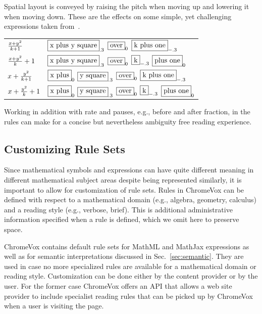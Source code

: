 \documentclass{sig-alternate}
\begin{document}
\noindent 
Spatial layout is conveyed by raising the pitch when moving up and lowering it
when moving down. These are the effects on some simple, yet challenging
expressions taken from~\cite{knuthart}.
\begin{tabular}{lp{}}
  $x+y^2\over k+1$ &
  $\framebox{\text{x plus y square}}_{.3}$ 
  $\framebox{\text{over}}_{0}$ 
  $\framebox{\text{k plus one}}_{-.3}$
  \\
  ${x+y^2\over k}+1$ &
  $\framebox{\text{x plus y square}}_{.3}$
  $\framebox{\text{over}}_{0}$
  $\framebox{\text{k}}_{-.3}$
  $\framebox{\text{plus one}}_{0}$
  \\
  $x+{y^2\over k+1}$ &
  $\framebox{\text{x plus}}_{0}$
  $\framebox{\text{y square}}_{.3}$
  $\framebox{\text{over}}_{0}$
  $\framebox{\text{k plus one}}_{-.3}$
  \\
  $x+{y^2\over k}+1$ &
  $\framebox{\text{x plus}}_{0}$
  $\framebox{\text{y square}}_{.3}$
  $\framebox{\text{over}}_{0}$
  $\framebox{\text{k}}_{-.3}$
  $\framebox{\text{plus one}}_{0}$
  \\
\end{tabular}
Working in addition with rate and pauses, e.g., before and after fraction, in
the rules can make for a concise but nevertheless ambiguity free reading
experience.


\subsection{Customizing Rule Sets}

Since mathematical symbols and expressions can have quite different meaning in
different mathematical subject areas despite being represented similarly, it is
important to allow for customization of rule sets. Rules in ChromeVox can be
defined with respect to a mathematical domain (e.g., algebra, geometry,
calculus) and a reading style (e.g., verbose, brief). This is additional
administrative information specified when a rule is defined, which we omit here
to preserve space.

ChromeVox contains default rule sets for MathML and MathJax expressions as well
as for semantic interpretations discussed in Sec.~\ref{sec:semantic}. They are
used in case no more specialized rules are available for a mathematical domain
or reading style.  Customization can be done either by the content provider or
by the user. For the former case ChromeVox offers an API that allows a web site
provider to include specialist reading rules that can be picked up by ChromeVox
when a user is visiting the page.
\end{document}
